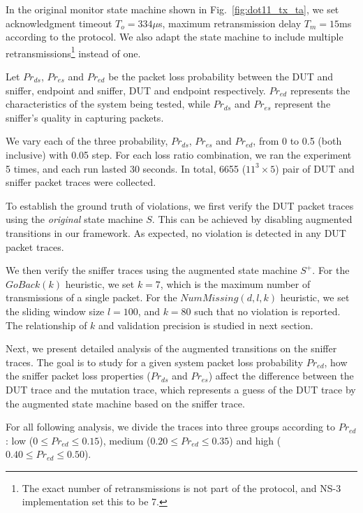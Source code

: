 In the original monitor state machine shown in Fig.~\ref{fig:dot11_tx_ta}, we
set acknowledgment timeout $T_o=334\mu$s, maximum retransmission delay
$T_m=15$ms according to the protocol. We also adapt the state machine to include
multiple retransmissions\footnote{The exact number of retransmissions is not
part of the protocol, and NS-3 implementation set this to be 7.} instead of one.

Let $Pr_{ds}$, $Pr_{es}$ and $Pr_{ed}$ be the packet loss probability between
the DUT and sniffer, endpoint and sniffer, DUT and endpoint respectively.
$Pr_{ed}$ represents the characteristics of the system being tested, while
$Pr_{ds}$ and $Pr_{es}$ represent the sniffer's quality in capturing packets.



We vary each of the three probability, $Pr_{ds}$, $Pr_{es}$ and $Pr_{ed}$, from
0 to 0.5 (both inclusive) with 0.05 step.  For each loss ratio combination, we
ran the experiment 5 times, and each run lasted
30 seconds. In total, 6655 ($11^3\times 5$) pair of DUT and sniffer packet
traces were collected.

To establish the ground truth of violations, we first verify the DUT packet
traces using the \textit{original} state machine $S$.  This can be achieved by
disabling augmented transitions in our framework.  As expected, no violation is
detected in any DUT packet traces.

We then verify the sniffer traces using the augmented state machine $S^+$.  For
the $\mathit{GoBack}(k)$ heuristic, we set $k=7$, which is the maximum number of
transmissions of a single packet. For the $\mathit{NumMissing}(d, l, k)$ heuristic, we
set the sliding window size $l=100$, and $k=80$ such that no violation is
reported. The relationship of $k$ and validation precision is studied in next
section.

Next, we present detailed analysis of the augmented transitions on the sniffer
traces. The goal is to study for a given system packet loss probability
$Pr_{ed}$, how the sniffer packet loss properties ($Pr_{ds}$ and $Pr_{es}$)
affect the difference between the DUT trace and the mutation trace, which represents
a guess of the DUT trace by the augmented state machine based on the sniffer
trace.

For all following analysis, we divide the traces into three groups according to
$Pr_{ed}$: low ($0 \le Pr_{ed} \le 0.15$), medium ($0.20 \le Pr_{ed} \le 0.35$)
and high ($0.40 \le Pr_{ed} \le 0.50$).

